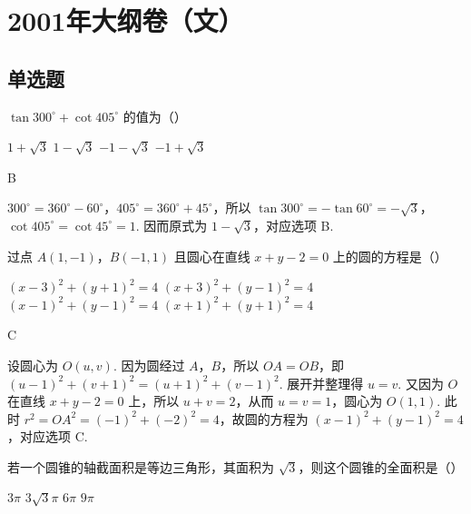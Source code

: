 \chapter{2001年大纲卷（文）}
\section{单选题}
\begin{problem}
\(\tan 300^{\circ} + \cot 405^{\circ}\) 的值为（\quad）

\choices
    {\(1 + \sqrt{3}\)}
    {\(1 - \sqrt{3}\)}
    {\(-1 - \sqrt{3}\)}
    {\(-1 + \sqrt{3}\)}
\end{problem}

\begin{answer}
B
\end{answer}

\begin{solution}
\(300^{\circ}=360^{\circ}-60^{\circ}\)，\(405^{\circ}=360^{\circ}+45^{\circ}\)，所以
\(\tan 300^{\circ}=-\tan 60^{\circ}=-\sqrt{3}\)，\(\cot 405^{\circ}=\cot 45^{\circ}=1\). 因而原式为 \(1-\sqrt{3}\)，对应选项 B.
\end{solution}

\begin{problem}
过点 \(A(1, -1)\)，\(B(-1, 1)\) 且圆心在直线 \(x + y - 2 = 0\) 上的圆的方程是（\quad）

\choices
    {\((x - 3)^2 + (y + 1)^2 = 4\)}
    {\((x + 3)^2 + (y - 1)^2 = 4\)}
    {\((x - 1)^2 + (y - 1)^2 = 4\)}
    {\((x + 1)^2 + (y + 1)^2 = 4\)}
\end{problem}

\begin{answer}
C
\end{answer}

\begin{solution}
设圆心为 \(O(u,v)\). 因为圆经过 \(A\)，\(B\)，所以 \(OA=OB\)，即
\((u-1)^2+(v+1)^2=(u+1)^2+(v-1)^2\). 展开并整理得 \(u=v\). 又因为 \(O\) 在直线 \(x+y-2=0\) 上，所以 \(u+v=2\)，从而 \(u=v=1\)，圆心为 \(O(1,1)\). 此时 \(r^2=OA^2=(-1)^2+(-2)^2=4\)，故圆的方程为 \((x-1)^2+(y-1)^2=4\)，对应选项 C.
\end{solution}

\begin{problem}
若一个圆锥的轴截面积是等边三角形，其面积为 \(\sqrt{3}\)，则这个圆锥的全面积是（\quad）

\choices
    {\(3\pi\)}
    {\(3\sqrt{3}\pi\)}
    {\(6\pi\)}
    {\(9\pi\)}
\end{problem}

